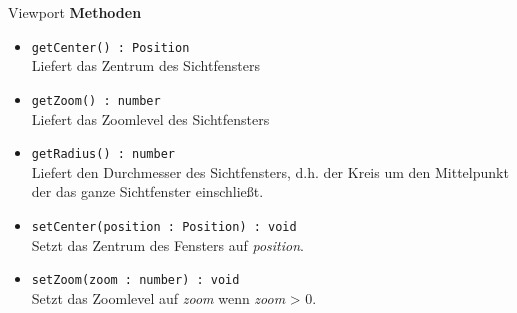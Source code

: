     \begin{Class}{Viewport}
        \textbf{Methoden}
        \begin{itemize}
            \item \texttt{getCenter() : Position}
            \\ Liefert das Zentrum des Sichtfensters 
            \item \texttt{getZoom() : number}
            \\ Liefert das Zoomlevel des Sichtfensters
            \item \texttt{getRadius() : number}
            \\ Liefert den Durchmesser des Sichtfensters, 
            d.h. der Kreis um den Mittelpunkt der das ganze Sichtfenster einschließt.
            \item \texttt{setCenter(position : Position) : void}
            \\ Setzt das Zentrum des Fensters auf \emph{position}.
            \item \texttt{setZoom(zoom : number) : void}
            \\ Setzt das Zoomlevel auf \emph{zoom} wenn \emph{zoom} > 0.
        \end{itemize}
    \end{Class}